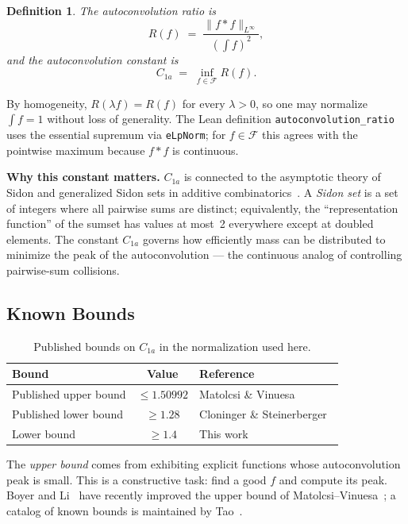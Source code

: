 \documentclass[11pt, letterpaper]{article}
\theoremstyle{paperplain}
\theoremstyle{paperdef}
\newtheorem{definition}[theorem]{Definition}
\begin{document}
\begin{definition}
The \emph{autoconvolution ratio} is
\[
  R(f)
  \;=\;
  \frac{\|f*f\|_{L^\infty}}{\left(\int f\right)^2},
\]
and the \emph{autoconvolution constant} is
\[
  C_{1a} \;=\; \inf_{f \in \mathcal{F}} R(f).
\]
\end{definition}

By homogeneity, $R(\lambda f)=R(f)$ for every $\lambda>0$, so one may
normalize $\int f=1$ without loss of generality.  The Lean definition
\texttt{autoconvolution\_ratio} uses the essential supremum via
\texttt{eLpNorm}; for $f\in\mathcal{F}$ this agrees with the pointwise
maximum because $f*f$ is continuous.

\medskip

\noindent\textbf{Why this constant matters.}  $C_{1a}$ is connected to
the asymptotic theory of Sidon and generalized Sidon sets in additive
combinatorics~\cite{ET41,MO2006,CRV10,MO2009,CS17}.  A
\emph{Sidon set} is a set of integers where all pairwise sums are
distinct; equivalently, the ``representation function'' of the sumset
has values at most~2 everywhere except at doubled elements.  The
constant $C_{1a}$ governs how efficiently mass can be distributed to
minimize the peak of the autoconvolution --- the continuous analog of
controlling pairwise-sum collisions.

\subsection{Known Bounds}

\begin{table}[t]
\centering
\begin{tabular}{lcl}
  \toprule
  \textbf{Bound} & \textbf{Value} & \textbf{Reference} \\
  \midrule
  Published upper bound & $\le 1.50992$ & Matolcsi \& Vinuesa~\cite{MV10} \\
  Published lower bound & $\ge 1.28$ & Cloninger \& Steinerberger~\cite{CS17} \\
  Lower bound & $\ge 1.4$ & This work \\
  \bottomrule
\end{tabular}
\caption[Published bounds on C1a in the normalization used here.]{Published bounds on $C_{1a}$ in the normalization used here.}
\label{tab:published-bounds}
\end{table}

The \emph{upper bound} comes from exhibiting explicit functions whose
autoconvolution peak is small.  This is a constructive task: find a
good $f$ and compute its peak.  Boyer and Li~\cite{BL25} have recently
improved the upper bound of Matolcsi--Vinuesa~\cite{MV10}; a catalog of
known bounds is maintained by Tao~\cite{Tao}.
\end{document}
